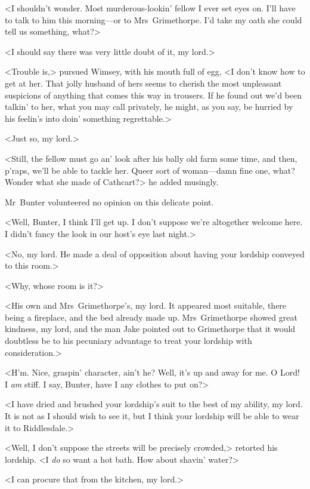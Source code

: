<I shouldn't wonder. Most murderous-lookin' fellow I ever set eyes on.  I'll have to talk to him this morning—or to Mrs~Grimethorpe. I'd take my oath she could tell us something, what?>

<I should say there was very little doubt of it, my lord.>

<Trouble is,> pursued Wimsey, with his mouth full of egg, <I don't know how to get at her. That jolly husband of hers seems to cherish the most unpleasant suspicions of anything that comes this way in trousers. If he found out we'd been talkin' to her, what you may call privately, he might, as you say, be hurried by his feelin's into doin' something regrettable.>

<Just so, my lord.>

<Still, the fellow must go an' look after his bally old farm some time, and then, p'raps, we'll be able to tackle her. Queer sort of woman—damn fine one, what? Wonder what she made of Cathcart?> he added musingly.

Mr~Bunter volunteered no opinion on this delicate point.

<Well, Bunter, I think I'll get up. I don't suppose we're altogether welcome here. I didn't fancy the look in our host's eye last night.>

<No, my lord. He made a deal of opposition about having your lordship conveyed to this room.>

<Why, whose room is it?>

<His own and Mrs~Grimethorpe's, my lord. It appeared most suitable, there being a fireplace, and the bed already made up. Mrs~Grimethorpe showed great kindness, my lord, and the man Jake pointed out to Grimethorpe that it would doubtless be to his pecuniary advantage to treat your lordship with consideration.>

<H'm. Nice, graspin' character, ain't he? Well, it's up and away for me. O Lord! I \emph{am} stiff. I say, Bunter, have I any clothes to put on?>

<I have dried and brushed your lordship's suit to the best of my ability, my lord. It is not as I should wish to see it, but I think your lordship will be able to wear it to Riddlesdale.>

<Well, I don't suppose the streets will be precisely crowded,> retorted his lordship. <I \emph{do} so want a hot bath. How about shavin' water?>

<I can procure that from the kitchen, my lord.>

